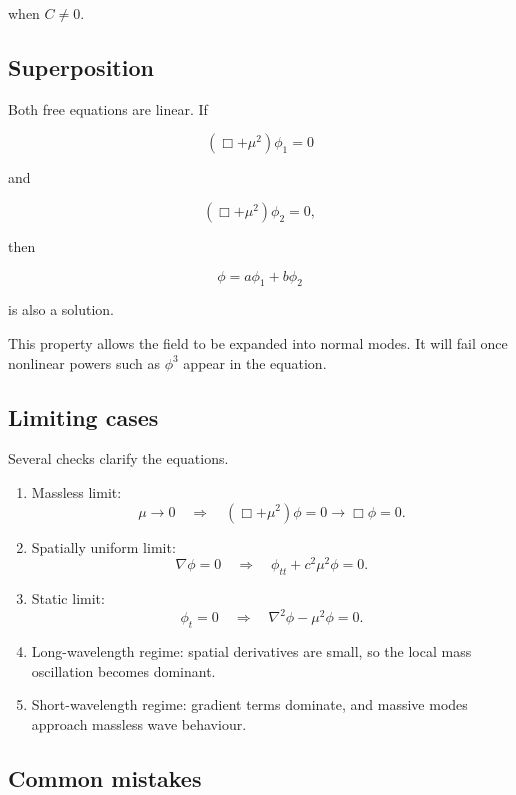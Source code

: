 when \(C\neq0\).

\subsection{Superposition}

Both free equations are linear. If

\[
(\Box+\mu^{2})\phi_{1}=0
\]

and

\[
(\Box+\mu^{2})\phi_{2}=0,
\]

then

\[
\boxed{
\phi=a\phi_{1}+b\phi_{2}
}
\]

is also a solution.

This property allows the field to be expanded into normal modes. It will fail once nonlinear powers such as \(\phi^{3}\) appear in the equation.

\subsection{Limiting cases}

Several checks clarify the equations.

\begin{enumerate}
    \item Massless limit:
    \[
    \mu\to0
    \quad\Longrightarrow\quad
    (\Box+\mu^{2})\phi=0
    \longrightarrow
    \Box\phi=0.
    \]

    \item Spatially uniform limit:
    \[
    \nabla\phi=0
    \quad\Longrightarrow\quad
    \phi_{tt}+c^{2}\mu^{2}\phi=0.
    \]

    \item Static limit:
    \[
    \phi_{t}=0
    \quad\Longrightarrow\quad
    \nabla^{2}\phi-\mu^{2}\phi=0.
    \]

    \item Long-wavelength regime:
    spatial derivatives are small, so the local mass oscillation becomes dominant.

    \item Short-wavelength regime:
    gradient terms dominate, and massive modes approach massless wave behaviour.
\end{enumerate}

\subsection{Common mistakes}


